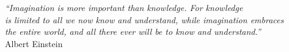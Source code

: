 \cleardoublepage
\thispagestyle{plain}

\vspace*{8cm}

\begin{flushright}
   \textsl{``Imagination is more important than knowledge. For knowledge\\ is limited to all we now know and understand, while imagination embraces\\ the entire world, and all there ever will be to know and understand.''} \\
\vspace*{1.5cm}
           Albert Einstein
\end{flushright}
